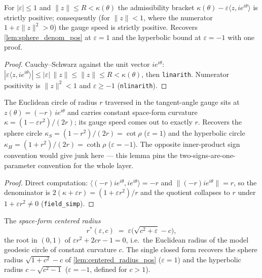 \begin{lemma}
  \label{lem:spaceform_denom_pos}
  For $|\varepsilon|\le1$ and $\|z\|\le R<\kappa(\theta)$ the admissibility
  bracket $\kappa(\theta)-\varepsilon\langle z, ie^{i\theta}\rangle$ is
  strictly positive; consequently (for $\|z\|<1$, where the numerator
  $1+\varepsilon\|z\|^2>0$) the gauge speed is strictly positive. Recovers
  \cref{lem:sphere_denom_pos} at $\varepsilon=1$ and the hyperbolic bound at
  $\varepsilon=-1$ with one proof.
\end{lemma}

\begin{proof}
  \leanok
  Cauchy--Schwarz against the unit vector $ie^{i\theta}$:
  $|\varepsilon\langle z, ie^{i\theta}\rangle|\le|\varepsilon|\,\|z\|\le
  \|z\|\le R<\kappa(\theta)$, then \texttt{linarith}. Numerator positivity is
  $\|z\|^2<1$ and $\varepsilon\ge-1$ (\texttt{nlinarith}).
\end{proof}

\begin{lemma}
  \label{lem:spaceform_speed_circle}
  The Euclidean circle of radius $r$ traversed in the tangent-angle gauge sits
  at $z(\theta)=(-r)\,ie^{i\theta}$ and carries constant space-form curvature
  $\kappa=(1-\varepsilon r^2)/(2r)$; its gauge speed comes out to exactly
  $r$. Recovers the sphere circle $\kappa_S=(1-r^2)/(2r)=\cot\rho$
  ($\varepsilon=1$) and the hyperbolic circle
  $\kappa_H=(1+r^2)/(2r)=\coth\rho$ ($\varepsilon=-1$). The opposite
  inner-product sign convention would give junk here — this lemma pins the
  two-signs-are-one-parameter convention for the whole layer.
\end{lemma}

\begin{proof}
  \leanok
  Direct computation: $\langle(-r)ie^{i\theta}, ie^{i\theta}\rangle=-r$ and
  $\|(-r)ie^{i\theta}\|=r$, so the denominator is
  $2(\kappa+\varepsilon r)=(1+\varepsilon r^2)/r$ and the quotient collapses
  to $r$ under $1+\varepsilon r^2\ne0$ (\texttt{field\_simp}).
\end{proof}

\begin{definition}
  \label{def:centered_radius}
  The \emph{space-form centered radius}
  \[
    r^\ast(\varepsilon,c)\;=\;
    \varepsilon\bigl(\sqrt{c^2+\varepsilon}-c\bigr),
  \]
  the root in $(0,1)$ of $\varepsilon r^2+2cr-1=0$, i.e.\ the Euclidean radius
  of the model geodesic circle of constant curvature $c$. The single closed
  form recovers the sphere radius $\sqrt{1+c^2}-c$ of
  \cref{lem:centered_radius_pos} ($\varepsilon=1$) and the hyperbolic radius
  $c-\sqrt{c^2-1}$ ($\varepsilon=-1$, defined for $c>1$).
\end{definition}


